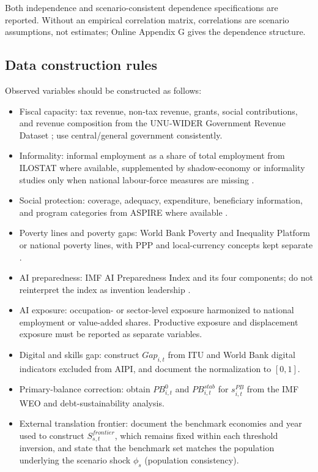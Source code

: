 \documentclass[11pt,a4paper]{article}
\begin{document}
Both independence and scenario-consistent dependence specifications are reported. Without an empirical correlation matrix, correlations are scenario assumptions, not estimates; Online Appendix G gives the dependence structure.

\subsection{Data construction rules}

Observed variables should be constructed as follows:
\begin{itemize}
    \item Fiscal capacity: tax revenue, non-tax revenue, grants, social contributions, and revenue composition from the UNU-WIDER Government Revenue Dataset \citep{unu2025grd}; use central/general government consistently.
    \item Informality: informal employment as a share of total employment from ILOSTAT where available, supplemented by shadow-economy or informality studies only when national labour-force measures are missing \citep{ilostat2026informal,medina2018shadow,worldbank2021informality}.
    \item Social protection: coverage, adequacy, expenditure, beneficiary information, and program categories from ASPIRE where available \citep{worldbank2026aspire}.
    \item Poverty lines and poverty gaps: World Bank Poverty and Inequality Platform or national poverty lines, with PPP and local-currency concepts kept separate \citep{worldbank2026pip}.
    \item AI preparedness: IMF AI Preparedness Index and its four components; do not reinterpret the index as invention leadership \citep{cazzaniga2024genai}.
    \item AI exposure: occupation- or sector-level exposure harmonized to national employment or value-added shares. Productive exposure and displacement exposure must be reported as separate variables.
    \item Digital and skills gap: construct $Gap_{i,t}$ from ITU and World Bank digital indicators excluded from AIPI, and document the normalization to $[0,1]$.
    \item Primary-balance correction: obtain $PB^0_{i,t}$ and $PB^{stab}_{i,t}$ for $s^{PB}_{i,t}$ from the IMF WEO and debt-sustainability analysis.
    \item External translation frontier: document the benchmark economies and year used to construct $S^{frontier}_{s,t}$, which remains fixed within each threshold inversion, and state that the benchmark set matches the population underlying the scenario shock $\phi_s$ (population consistency).
\end{itemize}
\end{document}
